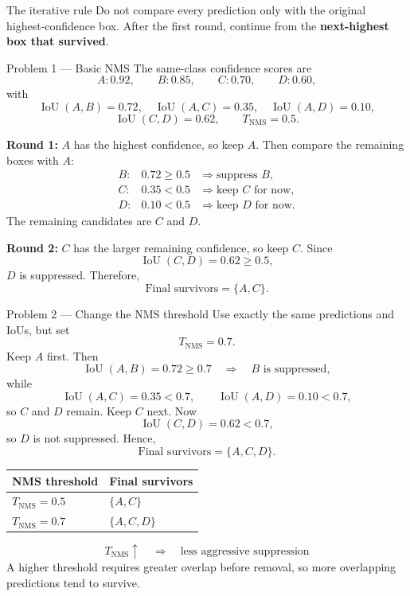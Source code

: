 \documentclass[11pt]{article}
\begin{document}
\begin{prioritybox}{The iterative rule}
Do not compare every prediction only with the original highest-confidence box. After the first round, continue from the \textbf{next-highest box that survived}.
\end{prioritybox}

\begin{practicebox}{Problem 1 --- Basic NMS}
The same-class confidence scores are
\[
A:0.92,\qquad B:0.85,\qquad C:0.70,\qquad D:0.60,
\]
with
\[
\operatorname{IoU}(A,B)=0.72,\quad
\operatorname{IoU}(A,C)=0.35,\quad
\operatorname{IoU}(A,D)=0.10,
\]
\[
\operatorname{IoU}(C,D)=0.62,
\qquad
T_{\mathrm{NMS}}=0.5.
\]

\textbf{Round 1:} \(A\) has the highest confidence, so keep \(A\). Then compare the remaining boxes with \(A\):
\[
\begin{array}{ccl}
B: & 0.72\geq0.5 & \Rightarrow \text{suppress }B,\\
C: & 0.35<0.5 & \Rightarrow \text{keep }C\text{ for now},\\
D: & 0.10<0.5 & \Rightarrow \text{keep }D\text{ for now}.
\end{array}
\]
The remaining candidates are \(C\) and \(D\).

\textbf{Round 2:} \(C\) has the larger remaining confidence, so keep \(C\). Since
\[
\operatorname{IoU}(C,D)=0.62\geq0.5,
\]
\(D\) is suppressed. Therefore,
\[
\boxed{\text{Final survivors}=\{A,C\}}.
\]
\end{practicebox}

\begin{practicebox}{Problem 2 --- Change the NMS threshold}
Use exactly the same predictions and IoUs, but set
\[
T_{\mathrm{NMS}}=0.7.
\]
Keep \(A\) first. Then
\[
\operatorname{IoU}(A,B)=0.72\geq0.7
\quad\Rightarrow\quad B\text{ is suppressed},
\]
while
\[
\operatorname{IoU}(A,C)=0.35<0.7,
\qquad
\operatorname{IoU}(A,D)=0.10<0.7,
\]
so \(C\) and \(D\) remain. Keep \(C\) next. Now
\[
\operatorname{IoU}(C,D)=0.62<0.7,
\]
so \(D\) is not suppressed. Hence,
\[
\boxed{\text{Final survivors}=\{A,C,D\}}.
\]

\begin{center}
\begin{tabularx}{0.75\textwidth}{>{\bfseries}X >{\centering\arraybackslash}X}
\toprule
NMS threshold & Final survivors \\
\midrule
\(T_{\mathrm{NMS}}=0.5\) & \(\{A,C\}\) \\
\(T_{\mathrm{NMS}}=0.7\) & \(\{A,C,D\}\) \\
\bottomrule
\end{tabularx}
\end{center}

\[
\boxed{
T_{\mathrm{NMS}}\uparrow
\quad\Longrightarrow\quad
\text{less aggressive suppression}
}
\]
A higher threshold requires greater overlap before removal, so more overlapping predictions tend to survive.
\end{practicebox}
\end{document}
